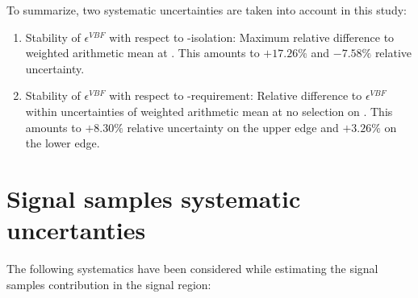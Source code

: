 To summarize, two systematic uncertainties are taken into account in this study:

\begin{enumerate}
	\item Stability of $\epsilon^{VBF}$ with respect to \hadtau-isolation: Maximum relative difference to weighted arithmetic mean at \gev. This amounts to $+17.26\%$ and  $-7.58\%$ relative uncertainty.
	\item Stability of $\epsilon^{VBF}$ with respect to \met-requirement: Relative difference to $\epsilon^{VBF}$ within uncertainties of weighted arithmetic mean at no selection on \met. This amounts to $+8.30\%$ relative uncertainty on the upper edge and $+3.26\%$ on the lower edge.
\end{enumerate}


\clearpage

\section{Signal samples systematic uncertanties}
\label{sec:systematics}

The following systematics have been considered while estimating the signal samples contribution in the signal region:

